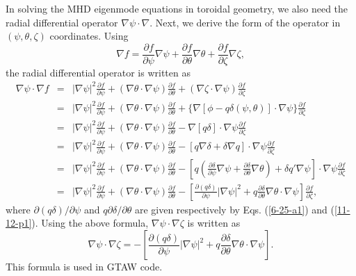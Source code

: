 \documentclass{article}
\begin{document}
In solving the MHD eigenmode equations in toroidal geometry, we also need the
radial differential operator $\nabla \psi \cdot \nabla$. Next, we derive the
form of the operator in $(\psi, \theta, \zeta)$ coordinates. Using
\[ \nabla f = \frac{\partial f}{\partial \psi} \nabla \psi + \frac{\partial
   f}{\partial \theta} \nabla \theta + \frac{\partial f}{\partial \zeta}
   \nabla \zeta, \]
the radial differential operator is written as
\begin{eqnarray}
  \nabla \psi \cdot \nabla f & = & | \nabla \psi |^2 \frac{\partial
  f}{\partial \psi} + (\nabla \theta \cdot \nabla \psi) \frac{\partial
  f}{\partial \theta} + (\nabla \zeta \cdot \nabla \psi) \frac{\partial
  f}{\partial \zeta} \nonumber\\
  & = & | \nabla \psi |^2 \frac{\partial f}{\partial \psi} + (\nabla \theta
  \cdot \nabla \psi) \frac{\partial f}{\partial \theta} + \{ \nabla [\phi - q
  \delta (\psi, \theta)] \cdot \nabla \psi \} \frac{\partial f}{\partial
  \zeta} \nonumber\\
  & = & | \nabla \psi |^2 \frac{\partial f}{\partial \psi} + (\nabla \theta
  \cdot \nabla \psi) \frac{\partial f}{\partial \theta} - \nabla [q \delta]
  \cdot \nabla \psi \frac{\partial f}{\partial \zeta} \nonumber\\
  & = & | \nabla \psi |^2 \frac{\partial f}{\partial \psi} + (\nabla \theta
  \cdot \nabla \psi) \frac{\partial f}{\partial \theta} - [q \nabla \delta +
  \delta \nabla q] \cdot \nabla \psi \frac{\partial f}{\partial \zeta}
  \nonumber\\
  & = & | \nabla \psi |^2 \frac{\partial f}{\partial \psi} + (\nabla \theta
  \cdot \nabla \psi) \frac{\partial f}{\partial \theta} - \left[ q \left(
  \frac{\partial \delta}{\partial \psi} \nabla \psi + \frac{\partial
  \delta}{\partial \theta} \nabla \theta \right) + \delta q' \nabla \psi
  \right] \cdot \nabla \psi \frac{\partial f}{\partial \zeta} \nonumber\\
  & = & | \nabla \psi |^2 \frac{\partial f}{\partial \psi} + (\nabla \theta
  \cdot \nabla \psi) \frac{\partial f}{\partial \theta} - \left[
  \frac{\partial (q \delta)}{\partial \psi} | \nabla \psi |^2 + q
  \frac{\partial \delta}{\partial \theta} \nabla \theta \cdot \nabla \psi
  \right] \frac{\partial f}{\partial \zeta},  \label{5-13-2}
\end{eqnarray}
where $\partial (q \delta) / \partial \psi$ and $q \partial \delta / \partial
\theta$ are given respectively by Eqs. (\ref{6-25-a1}) and (\ref{11-12-p1}).
Using the above formula, $\nabla \psi \cdot \nabla \zeta$ is written as
\begin{equation}
  \nabla \psi \cdot \nabla \zeta = - \left[ \frac{\partial (q
  \delta)}{\partial \psi} | \nabla \psi |^2 + q \frac{\partial
  \delta}{\partial \theta} \nabla \theta \cdot \nabla \psi \right] .
\end{equation}
This formula is used in GTAW code.
\end{document}

